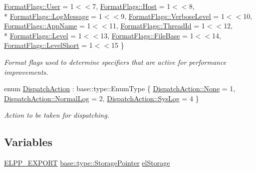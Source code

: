 \begin{DoxyCompactItemize}
\hyperlink{namespaceel_1_1base_a28939c5a884e67fcf12259f4b8848e00a8f9bfe9d1345237cb3b2b205864da075}{Format\+Flags\+::\+User} = 1$<$$<$7, 
\hyperlink{namespaceel_1_1base_a28939c5a884e67fcf12259f4b8848e00ac2ca16d048ec66e04bca283eab048ec2}{Format\+Flags\+::\+Host} = 1$<$$<$8, 
\\*
\hyperlink{namespaceel_1_1base_a28939c5a884e67fcf12259f4b8848e00a80672412fb77a287c9c90cbacf039fc7}{Format\+Flags\+::\+Log\+Message} = 1$<$$<$9, 
\hyperlink{namespaceel_1_1base_a28939c5a884e67fcf12259f4b8848e00a52e9b703699c35fb5be3d84511bc86b8}{Format\+Flags\+::\+Verbose\+Level} = 1$<$$<$10, 
\hyperlink{namespaceel_1_1base_a28939c5a884e67fcf12259f4b8848e00aa6d1acde6e20d49a9d81f90622732227}{Format\+Flags\+::\+App\+Name} = 1$<$$<$11, 
\hyperlink{namespaceel_1_1base_a28939c5a884e67fcf12259f4b8848e00a693e7589872f7acd3e69d831d022d6ea}{Format\+Flags\+::\+Thread\+Id} = 1$<$$<$12, 
\\*
\hyperlink{namespaceel_1_1base_a28939c5a884e67fcf12259f4b8848e00aa0db49ba470c1c9ae2128c3470339153}{Format\+Flags\+::\+Level} = 1$<$$<$13, 
\hyperlink{namespaceel_1_1base_a28939c5a884e67fcf12259f4b8848e00a363d6c255447a7ca6ef9c06b73a8a87d}{Format\+Flags\+::\+File\+Base} = 1$<$$<$14, 
\hyperlink{namespaceel_1_1base_a28939c5a884e67fcf12259f4b8848e00a9d8794d3178b4df3b87654adbed5c846}{Format\+Flags\+::\+Level\+Short} = 1$<$$<$15
 \}
\begin{DoxyCompactList}\small\item\em Format flags used to determine specifiers that are active for performance improvements. \end{DoxyCompactList}\item 
enum \hyperlink{namespaceel_1_1base_a3aa2563d38e47388ba242a1694fc2839}{Dispatch\+Action} \+: base\+::type\+::\+Enum\+Type \{ \hyperlink{namespaceel_1_1base_a3aa2563d38e47388ba242a1694fc2839a6adf97f83acf6453d4a6a4b1070f3754}{Dispatch\+Action\+::\+None} = 1, 
\hyperlink{namespaceel_1_1base_a3aa2563d38e47388ba242a1694fc2839a44d8ee68145a7d9849eeaa634c443602}{Dispatch\+Action\+::\+Normal\+Log} = 2, 
\hyperlink{namespaceel_1_1base_a3aa2563d38e47388ba242a1694fc2839aa0861ec9150978a150dcefab74fad51b}{Dispatch\+Action\+::\+Sys\+Log} = 4
 \}
\begin{DoxyCompactList}\small\item\em Action to be taken for dispatching. \end{DoxyCompactList}\end{DoxyCompactItemize}
\subsection*{Variables}
\begin{DoxyCompactItemize}
\item 
\hyperlink{easylogging_09_09_8h_a5155fe064b7cf0e577152f0468c85c7a}{E\+L\+P\+P\+\_\+\+E\+X\+P\+O\+R\+T} \hyperlink{namespaceel_1_1base_1_1type_a3c34822c3825018aca1526f2289b7976}{base\+::type\+::\+Storage\+Pointer} \hyperlink{namespaceel_1_1base_a0ec6b7a1bd89ad58dadc10f190142018}{el\+Storage}
\end{DoxyCompactItemize}


